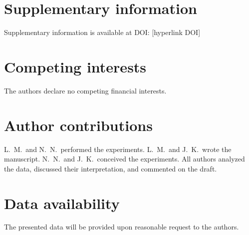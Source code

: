 \documentclass[aps,floatfix,12pt]{revtex4-2}
\begin{document}
\section*{Supplementary information}

Supplementary information is available at DOI: [hyperlink DOI]

\section*{Competing interests}
The authors declare no competing financial interests.

\section*{Author contributions}

L.\ M.\ and N.\ N.\ performed the experiments.
L.\ M.\ and J.\ K.\ wrote the manuscript.
N.\ N.\ and J.\ K.\ conceived the experiments.
All authors analyzed the data, discussed their interpretation, and commented on the draft.

\section*{Data availability}

The presented data will be provided upon reasonable request to the authors.
\end{document}
